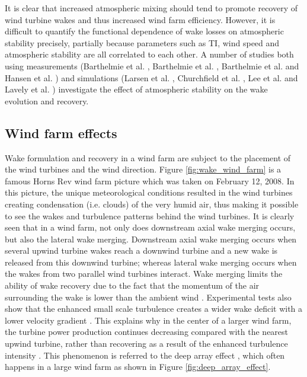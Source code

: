 \documentclass{umthesis}
\begin{document}
It is clear that increased atmospheric mixing should tend to promote recovery of wind turbine wakes and thus increased wind farm efficiency. However, it is difficult to quantify the functional dependence of wake losses on atmospheric stability precisely, partially because parameters such as TI, wind speed and atmospheric stability are all correlated to each other. A number of studies both using measurements (Barthelmie et al. \cite{barthelmie_modelling_2009}, Barthelmie et al. \cite{Barthelmie_wakes_2009}, Barthelmie et al. \cite{Ten_years} and Hansen et al. \cite{hansen_impact_2012}) and simulations (Larsen et al. \cite{Larsen_2009}, Churchfield et al. \cite{Churchfield_2012}, Lee et al. \cite{Lee_2014} and Lavely et al. \cite{Lavely_2011}) investigate the effect of atmospheric stability on the wake evolution and recovery.


\subsection{Wind farm effects}
Wake formulation and recovery in a wind farm are subject to the placement of the wind turbines and the wind direction. Figure \ref{fig:wake_wind_farm} is a famous Horns Rev wind farm picture which was taken on February 12, 2008. In this picture, the unique meteorological conditions resulted in the wind turbines creating condensation (i.e. clouds) of the very humid air, thus making it possible to see the wakes and turbulence patterns behind the wind turbines. It is clearly seen that in a wind farm, not only does downstream axial wake merging occurs, but also the lateral wake merging. Downstream axial wake merging occurs when several upwind turbine wakes reach a downwind turbine and a new wake is released from this downwind turbine; whereas lateral wake merging occurs when the wakes from two parallel wind turbines interact. Wake merging limits the ability of wake recovery due to the fact that the momentum of the air surrounding the wake is lower than the ambient wind \cite{Barthelmie_2011_Meteorological}. Experimental tests also show that the enhanced small scale turbulence creates a wider wake deficit with a lower velocity gradient \cite{Barthelmie_2011_Meteorological}\cite{Méchali}. This explains why in the center of a larger wind farm, the turbine power production continues decreasing compared with the nearest upwind turbine, rather than recovering as a result of the enhanced turbulence intensity \cite{Hao}. This phenomenon is referred to the deep array effect \cite{Barthelmie_Evaluation}\cite{Frandsen_2007}\cite{meyers_optimal_2012}\cite{Smith_2011}\cite{Schlez_2009}\cite{Andersen_2011}\cite{Calaf_2010}, which often happens in a large wind farm as shown in Figure \ref{fig:deep_array_effect}.
\end{document}
